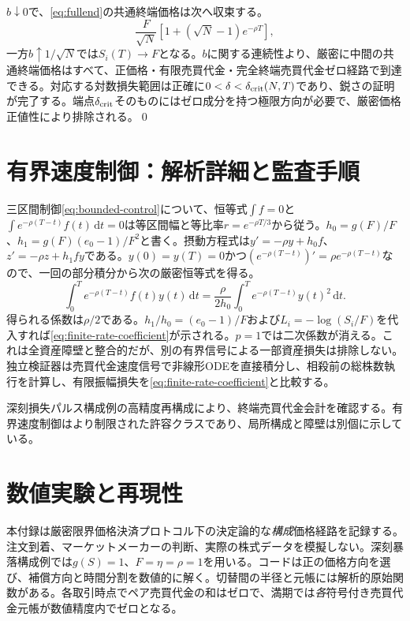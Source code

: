 \documentclass[11pt]{article}
\numberwithin{equation}{section}
\theoremstyle{definition}
\theoremstyle{remark}
\newcommand{\dd}{\,\mathrm{d}}
\begin{document}
$b\downarrow0$で、\eqref{eq:fullend}の共通終端価格は次へ収束する。
\[
\frac{F}{\sqrt N}\left[1+(\sqrt N-1)e^{-\rho T}\right],
\]
一方$b\uparrow1/\sqrt N$では$S_i(T)\to F$となる。$b$に関する連続性より、厳密に中間の共通終端価格はすべて、正価格・有限売買代金・完全終端売買代金ゼロ経路で到達できる。対応する対数損失範囲は正確に$0<\delta<\delta_{\rm crit}(N,T)$であり、鋭さの証明が完了する。端点$\delta_{\rm crit}$そのものにはゼロ成分を持つ極限方向が必要で、厳密価格正値性により排除される。\qed

\section{有界速度制御：解析詳細と監査手順}\label{app:rate}
三区間制御\eqref{eq:bounded-control}について、恒等式$\int f=0$と$\int e^{-\rho(T-t)}f(t)\dd t=0$は等区間幅と等比率$r=e^{-\rho T/3}$から従う。$h_0=g(F)/F$、$h_1=g(F)(e_0-1)/F^2$と書く。摂動方程式は$y'=-\rho y+h_0 f$、$z'=-\rho z+h_1fy$である。$y(0)=y(T)=0$かつ$(e^{-\rho(T-t)})'=\rho e^{-\rho(T-t)}$なので、一回の部分積分から次の厳密恒等式を得る。
\begin{equation}\label{eq:ibp}
\int_0^T e^{-\rho(T-t)}f(t)y(t)\dd t
=\frac{\rho}{2h_0}\int_0^T e^{-\rho(T-t)}y(t)^2\dd t.
\end{equation}
得られる係数は$\rho/2$である。$h_1/h_0=(e_0-1)/F$および$L_i=-\log(S_i/F)$を代入すれば\eqref{eq:finite-rate-coefficient}が示される。$p=1$では二次係数が消える。これは全資産障壁と整合的だが、別の有界信号による一部資産損失は排除しない。独立検証器は売買代金速度信号で非線形ODEを直接積分し、相殺前の総株数執行を計算し、有限振幅損失を\eqref{eq:finite-rate-coefficient}と比較する。

深刻損失パルス構成例の高精度再構成により、終端売買代金会計を確認する。有界速度制御はより制限された許容クラスであり、局所構成と障壁は別個に示している。

\section{数値実験と再現性}\label{app:numerics}
本付録は厳密限界価格決済プロトコル下の決定論的な\emph{構成}価格経路を記録する。注文到着、マーケットメーカーの判断、実際の株式データを模擬しない。深刻暴落構成例では$g(S)=1$、$F=\eta=\rho=1$を用いる。コードは正の価格方向を選び、補償方向と時間分割を数値的に解く。切替間の半径と元帳には解析的原始関数がある。各取引時点でペア売買代金の和はゼロで、満期では\emph{各}符号付き売買代金元帳が数値精度内でゼロとなる。
\end{document}
